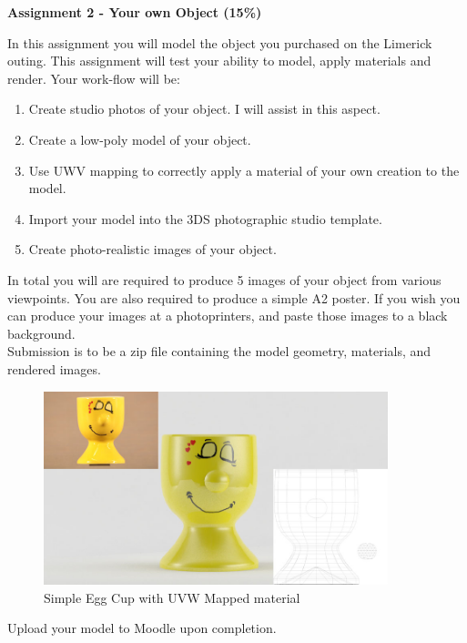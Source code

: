 

\begin{flushleft}
\Large\textbf{Assignment 2 - Your own Object (15\%)}\\
\end{flushleft}

In this assignment you will model the object you purchased on the Limerick outing.  This assignment will test your ability to model, apply materials and render.  Your work-flow will be:
\begin{enumerate}
	\item Create studio photos of your object. I will assist in this aspect.
	\item Create a low-poly model of your object.
	\item Use UWV mapping to correctly apply a material of your own creation to the model.
	\item Import your model into the 3DS photographic studio template.
	\item Create photo-realistic images of your object.
\end{enumerate}

In total you will are required to produce 5 images of your object from various viewpoints.  You are also required to produce a simple A2 poster.  If you wish you can produce your images at a photoprinters, and paste those images to a black background.\\

Submission is to be a zip file containing the model geometry, materials, and rendered images.\\

\begin{figure}[hb]
	\centering
		\includegraphics[width=10cm]{img/eggcup.jpg}
		\caption{Simple Egg Cup with UVW Mapped material}
	\label{fig:Egg Cup}
\end{figure}

Upload your model to Moodle upon completion.






